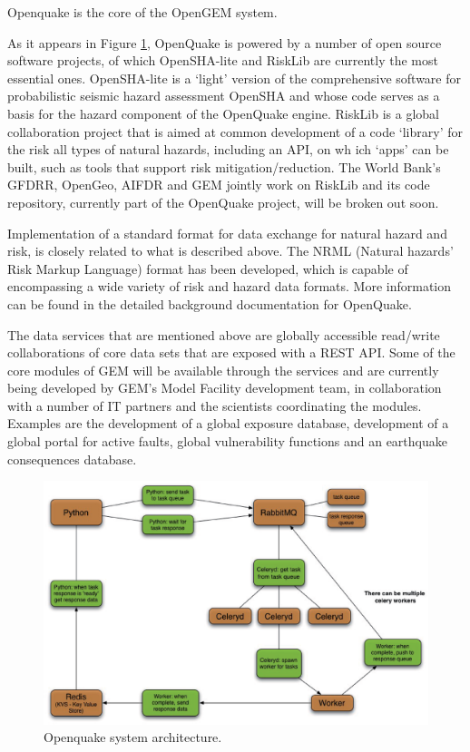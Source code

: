 Openquake is the core of the OpenGEM system. 

As it appears in Figure \ref{fig:oq_it}, OpenQuake is powered by a 
number of open source software projects, of which OpenSHA-lite and 
RiskLib are currently the most essential ones. 
OpenSHA-lite is a ‘light’ version of the comprehensive software for 
probabilistic seismic hazard assessment OpenSHA and whose code serves
as a basis for the hazard component of the OpenQuake engine. RiskLib 
is a global collaboration project that is aimed at common development 
of a code ‘library’ for the risk all types of natural hazards, including
an API, on wh ich ‘apps’ can be built, such as tools that support risk
mitigation/reduction. The World Bank’s GFDRR, OpenGeo, AIFDR and GEM 
jointly work on RiskLib and its code repository, currently part of 
the OpenQuake project, will be broken out soon.

Implementation of a standard format for data exchange for natural hazard
and risk,  is closely related to what is described above. The NRML 
(Natural hazards’ Risk Markup Language) format has been developed, which
is capable of encompassing a wide variety of risk and hazard data formats.
More information can be found in the detailed background documentation 
for OpenQuake.

The data services that are mentioned above are globally accessible 
read/write collaborations of core data sets that are exposed with a 
REST API. Some of the core modules of GEM will be available through 
the services and are currently being developed by GEM’s Model Facility 
development team, in collaboration with a number of IT partners and the 
scientists coordinating the modules. Examples are the development of a 
global exposure database, development of a global portal for active 
faults, global vulnerability functions and an earthquake consequences
database.

\begin{figure}
\includegraphics[width=\textwidth,angle=0]{./Figures/Part_Introduction/oq_system_architecture.eps}
\caption{Openquake system architecture.}
\label{fig:oq_it}
\end{figure}


